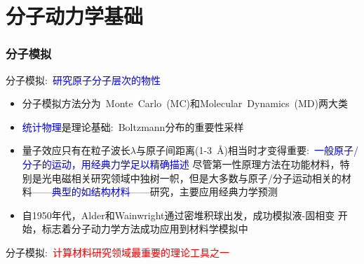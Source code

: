 \section{分子动力学基础}
\frame
{
	\frametitle{分子模拟}
	分子模拟:~\textcolor{blue}{研究原子分子层次的物性}
	\begin{itemize}
		\item 分子模拟方法分为~\textrm{Monte~Carlo~(MC)}和\textrm{Molecular~Dynamics~(MD)}两大类
		\item \textcolor{blue}{统计物理}是理论基础:~\textrm{Boltzmann}分布的重要性采样
	\end{itemize}
	\begin{itemize}
		\item 量子效应只有在粒子波长$\lambda$与原子间距离\textrm{(1-3~\AA)}相当时才变得重要:~\textcolor{blue}{一般原子/分子的运动，用经典力学足以精确描述}
			\vskip 2pt
			尽管第一性原理方法在功能材料，特别是光电磁相关研究领域中独树一帜，但是大多数与原子/分子运动相关的材料——\textcolor{blue}{典型的如结构材料}——研究，主要应用经典力学预测%
		\item 自\textrm{1950}年代，\textrm{Alder}和\textrm{Wainwright}通过密堆积球出发，成功模拟液-固相变%
			开始，标志着分子动力学方法成功应用到材料学模拟中
	\end{itemize}
	分子模拟:~\textcolor{red}{计算材料研究领域最重要的理论工具之一}
}

